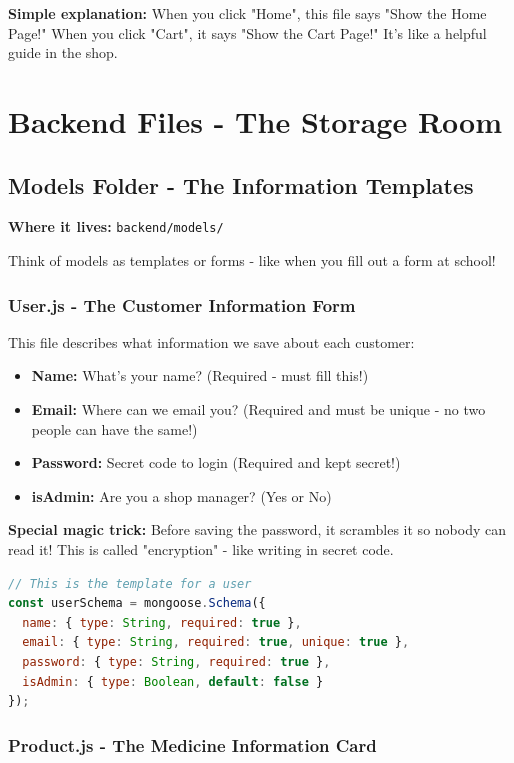 \documentclass[12pt]{article}
\begin{document}
\textbf{Simple explanation:}
When you click "Home", this file says "Show the Home Page!" When you click "Cart", it says "Show the Cart Page!" It's like a helpful guide in the shop.

\section{Backend Files - The Storage Room}

\subsection{Models Folder - The Information Templates}

\textbf{Where it lives:} \texttt{backend/models/}

Think of models as templates or forms - like when you fill out a form at school!

\subsubsection{User.js - The Customer Information Form}

This file describes what information we save about each customer:
\begin{itemize}
    \item \textbf{Name:} What's your name? (Required - must fill this!)
    \item \textbf{Email:} Where can we email you? (Required and must be unique - no two people can have the same!)
    \item \textbf{Password:} Secret code to login (Required and kept secret!)
    \item \textbf{isAdmin:} Are you a shop manager? (Yes or No)
\end{itemize}

\textbf{Special magic trick:} Before saving the password, it scrambles it so nobody can read it! This is called "encryption" - like writing in secret code.

\begin{lstlisting}[language=JavaScript]
// This is the template for a user
const userSchema = mongoose.Schema({
  name: { type: String, required: true },
  email: { type: String, required: true, unique: true },
  password: { type: String, required: true },
  isAdmin: { type: Boolean, default: false }
});
\end{lstlisting}

\subsubsection{Product.js - The Medicine Information Card}
\end{document}
